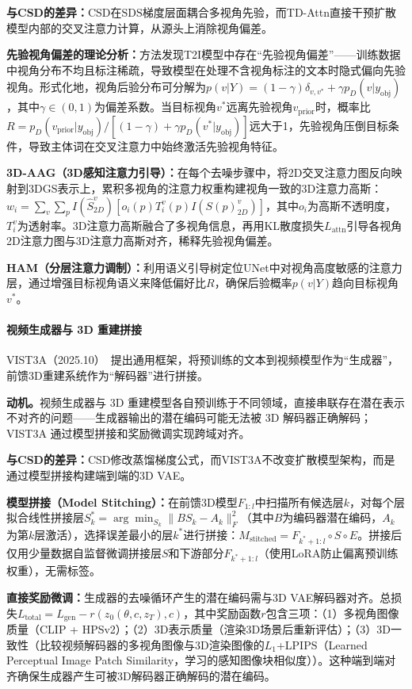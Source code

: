 \textbf{与CSD的差异：}CSD在SDS梯度层面耦合多视角先验，而TD-Attn直接干预扩散模型内部的交叉注意力计算，从源头上消除视角偏差。

\textbf{先验视角偏差的理论分析：}方法发现T2I模型中存在``先验视角偏差''——训练数据中视角分布不均且标注稀疏，导致模型在处理不含视角标注的文本时隐式偏向先验视角。形式化地，视角后验分布可分解为$p(v|Y) = (1-\gamma)\delta_{v,v^*} + \gamma p_D(v|y_\text{obj})$，其中$\gamma \in (0,1)$为偏差系数。当目标视角$v^*$远离先验视角$v_\text{prior}$时，概率比$R = p_D(v_\text{prior}|y_\text{obj}) / [(1-\gamma) + \gamma p_D(v^*|y_\text{obj})]$远大于1，先验视角压倒目标条件，导致主体词在交叉注意力中始终激活先验视角特征。

\textbf{3D-AAG（3D感知注意力引导）：}在每个去噪步骤中，将2D交叉注意力图反向映射到3DGS表示上，累积多视角的注意力权重构建视角一致的3D注意力高斯：$w_i = \sum_v \sum_p I(\hat{S}_{2D}^v)[o_i(p) T_i^v(p) I(S(p)_{2D}^v)]$，其中$o_i$为高斯不透明度，$T_i^v$为透射率。3D注意力高斯融合了多视角信息，再用KL散度损失$L_\text{attn}$引导各视角2D注意力图与3D注意力高斯对齐，稀释先验视角偏差。

\textbf{HAM（分层注意力调制）：}利用语义引导树定位UNet中对视角高度敏感的注意力层，通过增强目标视角语义来降低偏好比$R$，确保后验概率$p(v|Y)$趋向目标视角$v^*$。

\paragraph{视频生成器与 3D 重建拼接}

VIST3A（2025.10）~\cite{2510_13454}提出通用框架，将预训练的文本到视频模型作为``生成器''，前馈3D重建系统作为``解码器''进行拼接。

\textbf{动机。}视频生成器与 3D 重建模型各自预训练于不同领域，直接串联存在潜在表示不对齐的问题——生成器输出的潜在编码可能无法被 3D 解码器正确解码；VIST3A 通过模型拼接和奖励微调实现跨域对齐。

\textbf{与CSD的差异：}CSD修改蒸馏梯度公式，而VIST3A不改变扩散模型架构，而是通过模型拼接构建端到端的3D VAE。

\textbf{模型拼接（Model Stitching）：}在前馈3D模型$F_{1:l}$中扫描所有候选层$k$，对每个层拟合线性拼接层$S_k^* = \arg\min_{S_k}\|BS_k - A_k\|_F^2$（其中$B$为编码器潜在编码，$A_k$为第$k$层激活），选择误差最小的层$k^*$进行拼接：$M_\text{stitched} = F_{k^*+1:l} \circ S \circ E$。拼接后仅用少量数据自监督微调拼接层$S$和下游部分$F_{k^*+1:l}$（使用LoRA防止偏离预训练权重），无需标签。

\textbf{直接奖励微调：}生成器的去噪循环产生的潜在编码需与3D VAE解码器对齐。总损失$L_\text{total} = L_\text{gen} - r(z_0(\theta, c, z_T), c)$，其中奖励函数$r$包含三项：（1）多视角图像质量（CLIP + HPSv2）；（2）3D表示质量（渲染3D场景后重新评估）；（3）3D一致性（比较视频解码器的多视角图像与3D渲染图像的$L_1$+LPIPS（Learned Perceptual Image Patch Similarity，学习的感知图像块相似度））。这种端到端对齐确保生成器产生可被3D解码器正确解码的潜在编码。


